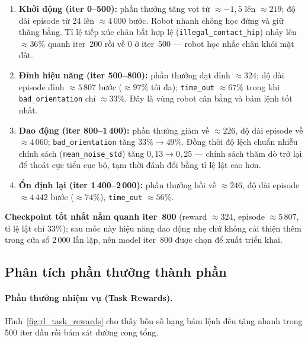 \begin{enumerate}
    \item \textbf{Khởi động (iter 0--500):} phần thưởng tăng vọt từ
    $\approx -1{,}5$ lên $\approx 219$; độ dài episode từ 24 lên $\approx 4\,000$
    bước. Robot nhanh chóng học đứng và giữ thăng bằng. Tỉ lệ tiếp xúc chân bất
    hợp lệ (\texttt{illegal\_contact\_hip}) nhảy lên $\approx 36\%$ quanh
    iter~200 rồi về $0$ ở iter~500 — robot học nhấc chân khỏi mặt đất.

    \item \textbf{Đỉnh hiệu năng (iter 500--800):} phần thưởng đạt đỉnh
    $\approx 324$; độ dài episode đỉnh $\approx 5\,807$ bước ($\approx 97\%$ tối
    đa); \texttt{time\_out} $\approx 67\%$ trong khi \texttt{bad\_orientation}
    chỉ $\approx 33\%$. Đây là vùng robot cân bằng và bám lệnh tốt nhất.

    \item \textbf{Dao động (iter 800--1\,400):} phần thưởng giảm về
    $\approx 226$, độ dài episode về $\approx 4\,060$; \texttt{bad\_orientation}
    tăng $33\%\to49\%$. Đồng thời độ lệch chuẩn nhiễu chính sách
    (\texttt{mean\_noise\_std}) tăng $0{,}13\to0{,}25$ — chính sách thăm dò trở
    lại để thoát cực tiểu cục bộ, tạm thời đánh đổi bằng tỉ lệ lật cao hơn.

    \item \textbf{Ổn định lại (iter 1\,400--2\,000):} phần thưởng hồi về
    $\approx 246$, độ dài episode $\approx 4\,442$ bước ($\approx 74\%$),
    \texttt{time\_out} $\approx 56\%$.
\end{enumerate}

\textbf{Checkpoint tốt nhất nằm quanh iter~800} (reward $\approx 324$, episode
$\approx 5\,807$, tỉ lệ lật chỉ $33\%$); sau mốc này hiệu năng dao động nhẹ chứ
không cải thiện thêm trong cửa sổ 2\,000 lần lặp, nên model iter~800 được chọn
để xuất triển khai.

\subsection{Phân tích phần thưởng thành phần}
\label{subsec:rl_rewards}

\paragraph{Phần thưởng nhiệm vụ (Task Rewards).}
Hình~\ref{fig:rl_task_rewards} cho thấy bốn số hạng bám lệnh đều tăng nhanh
trong 500 iter đầu rồi bám sát đường cong tổng.

